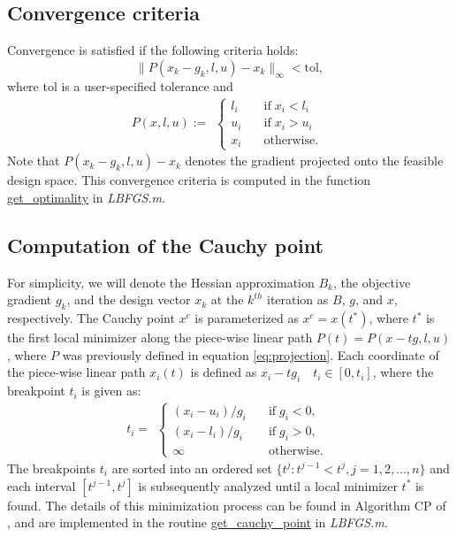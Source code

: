 \documentclass[11pt]{article}
\begin{document}
\subsection{Convergence criteria}

Convergence is satisfied if the following criteria holds:
%
\begin{equation}
\| P(x_k - g_k,l,u) - x_k \|_{\infty} < \text{tol},
\end{equation}
%
where tol is a user-specified tolerance and
%
\begin{equation}
P(x,l,u) := 
\begin{aligned}
\begin{cases}
l_i \quad & \text{if} \; x_i < l_i \\
u_i \quad & \text{if} \; x_i > u_i \\
x_i \quad & \text{otherwise}.
\end{cases}
\end{aligned}
\label{eq:projection}
\end{equation}
Note that $P(x_k - g_k,l,u) - x_k$ denotes
the gradient projected onto the feasible design space.
This convergence criteria is computed in the
function
\href{https://github.com/bgranzow/L-BFGS-B/blob/master/LBFGSB.m#L201}
{get\_optimality} in \emph{LBFGS.m}.

\subsection{Computation of the Cauchy point}

For simplicity, we will denote the Hessian
approximation $B_k$, the objective gradient
$g_k$, and the design vector $x_k$ at the $k^{th}$
iteration as $B$, $g$, and $x$, respectively.
The Cauchy point $x^c$ is parameterized
as $x^c = x(t^*)$, where $t^*$ is the first
local minimizer along the piece-wise linear
path $P(t) = P(x-tg,l,u)$, where $P$ was previously
defined in equation \eqref{eq:projection}.
Each coordinate of the piece-wise linear path
$x_i(t)$ is defined as $x_i - t g_i \quad t_i \in [0, t_i]$,
where the breakpoint $t_i$ is given as:
%
\begin{equation}
t_i =
\begin{aligned}
\begin{cases}
(x_i - u_i) / g_i \quad & \text{if} \; g_i < 0, \\
(x_i - l_i) / g_i \quad & \text{if} \; g_i > 0, \\
\infty \quad & \text{otherwise}.
\end{cases}
\end{aligned}
\end{equation}
%
The breakpoints $t_i$ are sorted into an ordered set
$\{t^j : t^{j-1} < t^j, j=1,2,\dots,n \}$
and each interval $[t^{j-1},t^j]$ is subsequently
analyzed until a local minimizer $t^*$ is found.
The details of this minimization process can
be found in Algorithm CP of \cite{lbfgsb}, and
are implemented in the routine
\href{https://github.com/bgranzow/L-BFGS-B/blob/master/LBFGSB.m#L261}
{get\_cauchy\_point} in \emph{LBFGS.m}.
\end{document}
